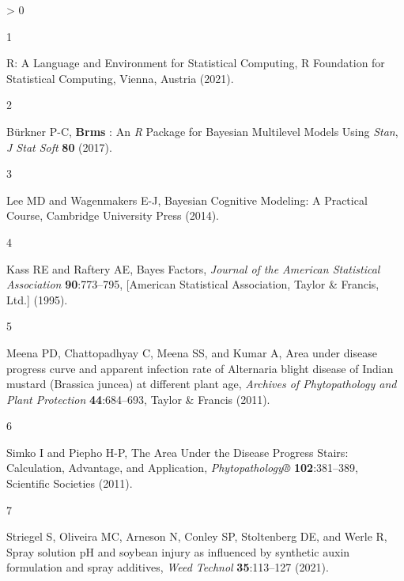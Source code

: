 \documentclass[
  12pt,
  a4paper,
]{article}
\newlength{\cslhangindent}
\newlength{\csllabelwidth}
\newenvironment{CSLReferences}[2] %
 {%
  \setlength{\parindent}{0pt}
  \ifodd #1 \everypar{\setlength{\hangindent}{\cslhangindent}}\ignorespaces\fi
  \ifnum #2 > 0
  \setlength{\parskip}{#2\baselineskip}
  \fi
 }%
 {}
\newcommand{\CSLLeftMargin}[1]{\parbox[t]{\csllabelwidth}{#1}}
\newcommand{\CSLRightInline}[1]{\parbox[t]{\linewidth - \csllabelwidth}{#1}\break}
\begin{document}
\hypertarget{refs}{}
\begin{CSLReferences}{1}{0}
\leavevmode\hypertarget{ref-LanguageEnvironmentStatistical2021}{}%
\CSLLeftMargin{1 }
\CSLRightInline{R: {A Language} and {Environment} for {Statistical
Computing}, {R Foundation for Statistical Computing}, {Vienna, Austria}
(2021).}

\leavevmode\hypertarget{ref-burknerBrmsPackageBayesian2017}{}%
\CSLLeftMargin{2 }
\CSLRightInline{Bürkner P-C, \textbf{Brms} : {An} {\emph{R}} {Package}
for {Bayesian Multilevel Models Using} {\emph{Stan}}, \emph{J Stat Soft}
\textbf{80} (2017).}

\leavevmode\hypertarget{ref-leeBayesianCognitiveModeling2014}{}%
\CSLLeftMargin{3 }
\CSLRightInline{Lee MD and Wagenmakers E-J, Bayesian {Cognitive
Modeling}: {A Practical Course}, {Cambridge University Press} (2014).}

\leavevmode\hypertarget{ref-kassBayesFactors1995}{}%
\CSLLeftMargin{4 }
\CSLRightInline{Kass RE and Raftery AE, Bayes {Factors}, \emph{Journal
of the American Statistical Association} \textbf{90}:773--795,
{{[}American Statistical Association, Taylor \& Francis, Ltd.{]}}
(1995).}

\leavevmode\hypertarget{ref-meenaAreaDiseaseProgress2011}{}%
\CSLLeftMargin{5 }
\CSLRightInline{Meena PD, Chattopadhyay C, Meena SS, and Kumar A, Area
under disease progress curve and apparent infection rate of {Alternaria}
blight disease of {Indian} mustard ({Brassica} juncea) at different
plant age, \emph{Archives of Phytopathology and Plant Protection}
\textbf{44}:684--693, {Taylor \& Francis} (2011).}

\leavevmode\hypertarget{ref-simkoAreaDiseaseProgress2011}{}%
\CSLLeftMargin{6 }
\CSLRightInline{Simko I and Piepho H-P, The {Area Under} the {Disease
Progress Stairs}: {Calculation}, {Advantage}, and {Application},
\emph{Phytopathology®} \textbf{102}:381--389, {Scientific Societies}
(2011).}

\leavevmode\hypertarget{ref-striegelSpraySolutionPH2021}{}%
\CSLLeftMargin{7 }
\CSLRightInline{Striegel S, Oliveira MC, Arneson N, Conley SP,
Stoltenberg DE, and Werle R, Spray solution {pH} and soybean injury as
influenced by synthetic auxin formulation and spray additives,
\emph{Weed Technol} \textbf{35}:113--127 (2021).}

\end{CSLReferences}
\end{document}
